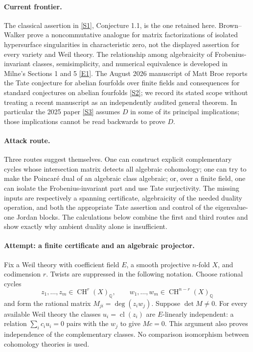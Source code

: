 \documentclass[11pt,a4paper]{article}
\newcommand{\Q}{\mathbb{Q}}
\newcommand{\sref}[2]{\hyperlink{source:#1:#2}{[S#2]}}
\newcommand{\eref}[2]{\hyperlink{extra:#1:#2}{[E#2]}}
\numberwithin{equation}{section}
\begin{document}
\paragraph{Current frontier.}
The classical assertion in \sref{statement}{1}, Conjecture 1.1, is the one
retained here. Brown--Walker prove a noncommutative analogue for matrix
factorizations of isolated hypersurface singularities in characteristic
zero, not the displayed assertion for every variety and Weil theory.
The relationship among algebraicity of Frobenius-invariant classes,
semisimplicity, and numerical equivalence is developed in Milne's
Sections 1 and 5 \eref{statement}{1}. The August 2026 manuscript of Matt Broe
reports the Tate conjecture for abelian fourfolds over finite fields and
consequences for standard conjectures on abelian fourfolds \sref{statement}{2};
we record its stated scope without treating a recent manuscript as an
independently audited general theorem. In particular the 2025 paper
\sref{statement}{3} assumes $D$ in some of its principal implications; those
implications cannot be read backwards to prove $D$.

\paragraph{Attack route.}
Three routes suggest themselves. One can construct explicit complementary
cycles whose intersection matrix detects all algebraic cohomology; one
can try to make the Poincar\'e dual of an algebraic class algebraic; or,
over a finite field, one can isolate the Frobenius-invariant part and use
Tate surjectivity. The missing inputs are respectively a spanning
certificate, algebraicity of the needed duality operation, and both the
appropriate Tate assertion and control of the eigenvalue-one Jordan
blocks. The calculations below combine the first and third routes and
show exactly why ambient duality alone is insufficient.

\paragraph{Attempt: a finite certificate and an algebraic projector.}
Fix a Weil theory with coefficient field $E$, a smooth projective $n$-fold
$X$, and codimension $r$. Twists are suppressed in the following notation.
Choose rational cycles
\[
 z_1,\ldots,z_m\in\operatorname{CH}^r(X)_{\Q},\qquad
 w_1,\ldots,w_m\in\operatorname{CH}^{n-r}(X)_{\Q}
\]
and form the rational matrix $M_{ji}=\deg(z_iw_j)$. Suppose
$\det M\ne0$. For every available Weil theory the classes
$u_i=\operatorname{cl}(z_i)$ are $E$-linearly independent: a relation
$\sum_i c_i u_i=0$ pairs with the $w_j$ to give $Mc=0$.
This argument also proves independence of the complementary classes.
No comparison isomorphism between cohomology theories is used.
\end{document}
